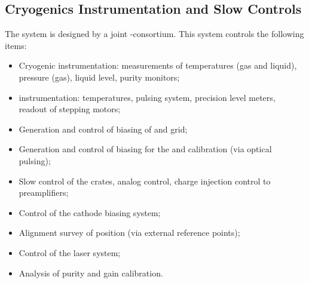 \subsection{Cryogenics Instrumentation and Slow Controls}
\label{v4:fddp-ov:sc}
The  system is designed by a joint \single{}-\dual consortium. %
This system controls the %
following items:

\begin{itemize}
\item Cryogenic instrumentation: measurements of temperatures (gas and liquid), pressure (gas), liquid level, purity monitors;
\item {} instrumentation: temperatures, pulsing system, precision level meters, readout of  stepping motors;
\item Generation and control of  biasing of  and grid;
\item Generation and control of  biasing for the  and calibration (via optical pulsing);
\item Slow control of the  crates, analog  control, charge injection control to preamplifiers;
\item Control of the cathode  biasing system;
\item Alignment survey of  position (via external reference points);
\item Control of the laser system;
\item Analysis of \lar purity and   gain calibration.
\end{itemize}
